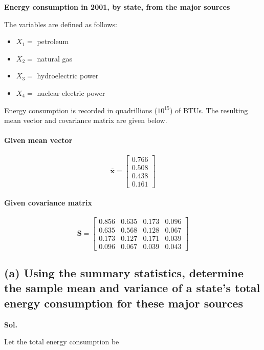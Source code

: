 \documentclass[12pt]{article}
\begin{document}
\textbf{Energy consumption in 2001, by state, from the major sources}

The variables are defined as follows:
\begin{itemize}
    \item $X_1 =$ petroleum
    \item $X_2 =$ natural gas
    \item $X_3 =$ hydroelectric power
    \item $X_4 =$ nuclear electric power
\end{itemize}

Energy consumption is recorded in quadrillions ($10^{15}$) of BTUs. The resulting mean vector and covariance matrix are given below.

\paragraph{Given mean vector}
\[
\bar{\mathbf{x}} = \begin{bmatrix}
0.766 \\
0.508 \\
0.438 \\
0.161
\end{bmatrix}
\]

\paragraph{Given covariance matrix}
\[
\mathbf{S} = \begin{bmatrix}
0.856 & 0.635 & 0.173 & 0.096 \\
0.635 & 0.568 & 0.128 & 0.067 \\
0.173 & 0.127 & 0.171 & 0.039 \\
0.096 & 0.067 & 0.039 & 0.043
\end{bmatrix}
\]

\vspace{0.7cm}

\subsection*{(a) Using the summary statistics, determine the sample mean and variance of a state's total energy consumption for these major sources}

\vspace{0.2cm}

\textbf{Sol.}

\vspace{0.2cm}

Let the total energy consumption be
\end{document}
